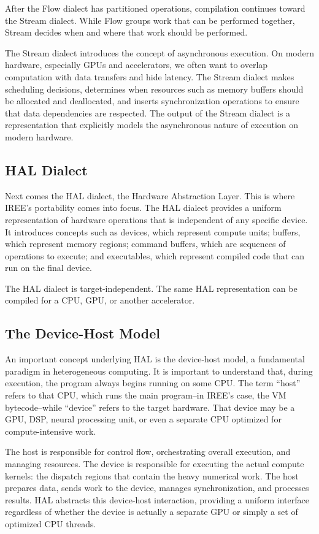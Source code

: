 \documentclass[11pt,a4paper]{article}
\begin{document}
After the Flow dialect has partitioned operations, compilation continues toward the Stream dialect. While Flow groups work that can be performed together, Stream decides when and where that work should be performed.

The Stream dialect introduces the concept of asynchronous execution. On modern hardware, especially GPUs and accelerators, we often want to overlap computation with data transfers and hide latency. The Stream dialect makes scheduling decisions, determines when resources such as memory buffers should be allocated and deallocated, and inserts synchronization operations to ensure that data dependencies are respected. The output of the Stream dialect is a representation that explicitly models the asynchronous nature of execution on modern hardware.

\subsection{HAL Dialect}

Next comes the HAL dialect, the Hardware Abstraction Layer. This is where IREE's portability comes into focus. The HAL dialect provides a uniform representation of hardware operations that is independent of any specific device. It introduces concepts such as devices, which represent compute units; buffers, which represent memory regions; command buffers, which are sequences of operations to execute; and executables, which represent compiled code that can run on the final device.

The HAL dialect is target-independent. The same HAL representation can be compiled for a CPU, GPU, or another accelerator.

\subsection{The Device-Host Model}

An important concept underlying HAL is the device-host model, a fundamental paradigm in heterogeneous computing. It is important to understand that, during execution, the program always begins running on some CPU. The term ``host'' refers to that CPU, which runs the main program--in IREE's case, the VM bytecode--while ``device'' refers to the target hardware. That device may be a GPU, DSP, neural processing unit, or even a separate CPU optimized for compute-intensive work.

The host is responsible for control flow, orchestrating overall execution, and managing resources. The device is responsible for executing the actual compute kernels: the dispatch regions that contain the heavy numerical work. The host prepares data, sends work to the device, manages synchronization, and processes results. HAL abstracts this device-host interaction, providing a uniform interface regardless of whether the device is actually a separate GPU or simply a set of optimized CPU threads.
\end{document}
